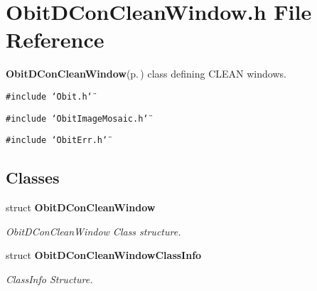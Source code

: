\section{Obit\-DCon\-Clean\-Window.h File Reference}
\label{ObitDConCleanWindow_8h}
{\bf Obit\-DCon\-Clean\-Window}{\rm (p.\,\pageref{structObitDConCleanWindow})} class defining CLEAN windows. 

{\tt \#include \char`\"{}Obit.h\char`\"{}}\par
{\tt \#include \char`\"{}Obit\-Image\-Mosaic.h\char`\"{}}\par
{\tt \#include \char`\"{}Obit\-Err.h\char`\"{}}\par
\subsection*{Classes}
\begin{CompactItemize}
\item 
struct {\bf Obit\-DCon\-Clean\-Window}
\begin{CompactList}\small\item\em Obit\-DCon\-Clean\-Window Class structure. \item\end{CompactList}\item 
struct {\bf Obit\-DCon\-Clean\-Window\-Class\-Info}
\begin{CompactList}\small\item\em Class\-Info Structure. \item\end{CompactList}\end{CompactItemize}
